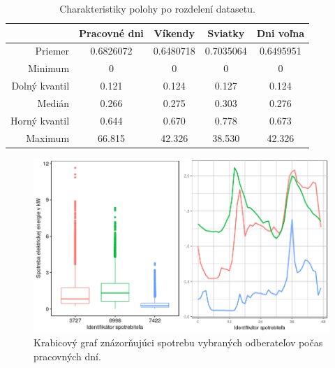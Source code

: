 \documentclass[a4paper,twoside,slovak,12pt,appendix]{article}
\begin{document}
\begin{table}[ht]
  \centering
  \caption{Charakteristiky polohy po rozdelení datasetu.}
  \label{tab:dataset-statistics}
  \begin{tabular}{|r|c|c|c|c|}
    \hline
					&  \textbf{Pracovné dni}  &	\textbf{Víkendy}	&	\textbf{Sviatky}	&	\textbf{Dni voľna} 	\\ \hline
		Priemer				&		0.6826072			&		0.6480718				&		0.7035064				&		0.6495951				 	\\ \hline
		Minimum				&		0							&		0								&		0								&		0								 	\\ \hline
		Dolný kvantil	&		0.121					&		0.124						&		0.127						&		0.124							\\ \hline
		Medián				&		0.266					&		0.275						&		0.303						&		0.276							\\ \hline
		Horný kvantil	&		0.644					&		0.670						&		0.778						&		0.673							\\ \hline
		Maximum				&		66.815				&		42.326					&		38.530					&		42.326						\\ \hline
  \end{tabular}
\end{table}

\begin{figure}[htbp]
  \centering
  \includegraphics[width=\textwidth]{workdays_plot.png}
  \caption{Krabicový graf znázorňujúci spotrebu vybraných odberateľov počas pracovných dní.}
  \label{fig:workdays-plot}
\end{figure}
\end{document}
